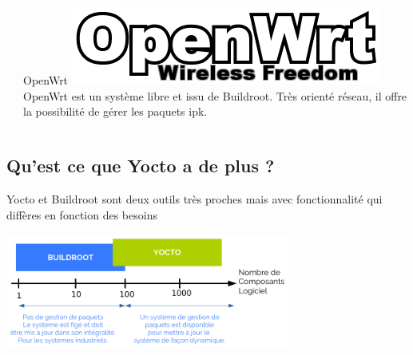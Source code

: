 \documentclass[compress]{smilebeamer}
\begin{document}
\begin{frame}
\begin{columns}[t]
\begin{column}{0.33\textwidth}
	\end{column}
	\begin{column}{0.33\textwidth}
	\begin{exampleblock}{OpenWrt}
		\includegraphics[width=\textwidth]{logos/OpenWrt.png}
		\newline
		\newline
		\newline
		OpenWrt est un système libre et issu de Buildroot. Très orienté réseau, il offre la possibilité de gérer les paquets ipk.
	\end{exampleblock}   
	\end{column}
\end{columns} 
\end{frame}

%
%
\subsection{Qu'est ce que Yocto a de plus ?}

\begin{frame}
Yocto et Buildroot sont deux outils très proches mais avec fonctionnalité qui diffères en fonction des besoins
\begin{center}
	\includegraphics[width=0.7\textwidth]{schemas/buildroot_vs_yocto.png}	
\end{center}
\end{frame}
\end{document}
